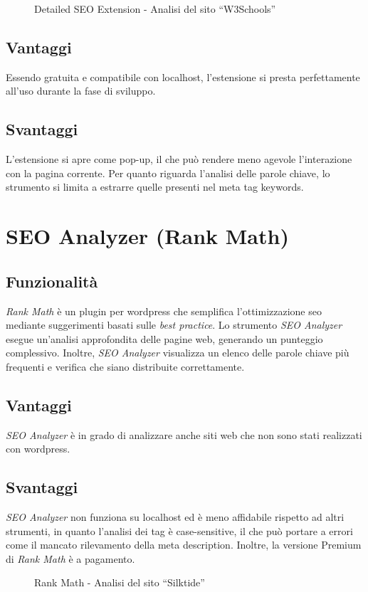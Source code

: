 \begin{figure}[H]
    \centering 
    \caption{Detailed SEO Extension - Analisi del sito “W3Schools”}
\end{figure}

\subsection{Vantaggi}
\par Essendo gratuita e compatibile con \gls{localhost}, l'estensione si presta perfettamente all'uso durante la fase di sviluppo.

\subsection{Svantaggi}
\par L'estensione si apre come pop-up, il che può rendere meno agevole l'interazione con la pagina corrente. Per quanto riguarda l'analisi delle parole chiave, lo strumento si limita a estrarre quelle presenti nel meta tag keywords.

\section{SEO Analyzer (Rank Math)}

\subsection{Funzionalità}
\par \textit{Rank Math} è un plugin per \gls{wordpress} che semplifica l'ottimizzazione \gls{seo} mediante suggerimenti basati sulle \textit{best practice}. Lo strumento \textit{SEO Analyzer} esegue un'analisi approfondita delle pagine web, generando un punteggio complessivo. Inoltre, \textit{SEO Analyzer} visualizza un elenco delle parole chiave più frequenti e verifica che siano distribuite correttamente.

\subsection{Vantaggi}
\par \textit{SEO Analyzer} è in grado di analizzare anche siti web che non sono stati realizzati con \gls{wordpress}.

\subsection{Svantaggi}
\par \textit{SEO Analyzer} non funziona su \gls{localhost} ed è meno affidabile rispetto ad altri strumenti, in quanto l'analisi dei tag è \gls{case-sensitive}, il che può portare a errori come il mancato rilevamento della meta description. Inoltre, la versione Premium di \textit{Rank Math} è a pagamento.

\begin{figure}[H]
    \centering 
    \caption{Rank Math - Analisi del sito “Silktide”}
\end{figure}